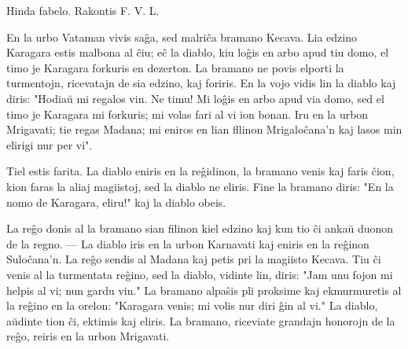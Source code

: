 \begin{center}
\footnotesize Hinda fabelo. Rakontis F. V. L.
\end{center}

   En la urbo Vataman vivis sa\^ga, sed malri\^ca bramano Kecava. Lia
edzino Karagara estis malbona al \^ciu; e\^c la diablo, kiu lo\^gis
en arbo apud tiu domo, el timo je Karagara forkuris en dezerton. La
bramano ne povis elporti la turmentojn, ricevatajn de sia edzino,
kaj foriris. En la vojo vidis lin la diablo kaj diris: "Hodia\u u
mi regalos vin. Ne timu! Mi lo\^gis en arbo apud via domo, sed el
timo je Karagara mi forkuris; mi volas fari al vi ion bonan. Iru en
la urbon Mrigavati; tie regas Madana; mi eniros en lian fllinon
Mrigalo\^cana'n kaj lasos min elirigi nur per vi".

   Tiel estis farita. La diablo eniris en la re\^gidinon, la bramano
venis kaj faris \^cion, kion faras la aliaj magiistoj, sed la diablo
ne eliris. Fine la bramano diris: "En la nomo de Karagara, eliru!"
kaj la diablo obeis.

   La re\^go donis al la bramano sian filinon kiel edzino kaj kun tio \^ci
anka\u u duonon de la regno. --- La diablo iris en la urbon
Karnavati kaj eniris en la re\^ginon Sulo\^cana'n. La re\^go sendis
al Madana kaj petis pri la magiisto Kecava. Tiu \^ci venis al la
turmentata re\^gino, sed la diablo, vidinte lin, diris: "Jam unu
fojon mi helpis al vi; nun gardu vin." La bramano alpa\^sis pli
proksime kaj ekmurmuretis al la re\^gino en la orelon: "Karagara
venis; mi volis nur diri \^gin al vi." La diablo, a\u udinte tion
\^ci, ektimis kaj eliris. La bramano, riceviate grandajn honorojn de
la re\^go, reiris en la urbon Mrigavati.

\smallrule{}
